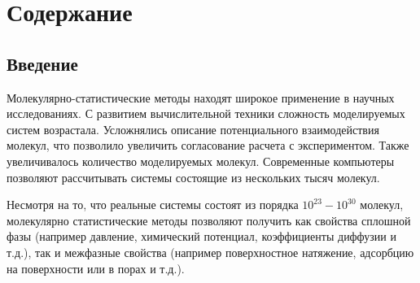 \chapter{Содержание}

\section*{Введение}

Молекулярно-статистические методы находят широкое применение в научных исследованиях. С развитием вычислительной техники сложность моделируемых систем возрастала. Усложнялись описание потенциального взаимодействия молекул, что позволило увеличить согласование расчета с экспериментом. Также увеличивалось количество моделируемых молекул. Современные компьютеры позволяют рассчитывать системы состоящие из нескольких тысяч молекул.

Несмотря на то, что реальные системы состоят из порядка $10^{23} - 10^{30}$ молекул, молекулярно статистические методы позволяют получить как свойства сплошной фазы (например давление, химический потенциал, коэффициенты диффузии и т.д.), так и межфазные свойства (например поверхностное натяжение, адсорбцию на поверхности или в порах и т.д.).


